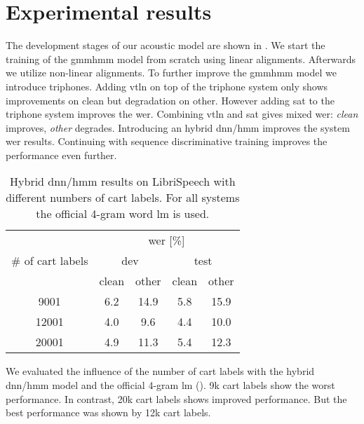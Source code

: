 \documentclass[a4paper]{article}
\begin{document}
\section{Experimental results}
\label{sec:results}

The development stages of our acoustic model are shown in .
We start the training of the \ac{gmmhmm} model from scratch using linear alignments.
Afterwards we utilize non-linear alignments.
To further improve the \ac{gmmhmm} model we introduce triphones.
Adding \ac{vtln} on top of the triphone system only shows improvements on clean but degradation on other.
However adding \ac{sat} to the triphone system improves the \ac{wer}.
Combining \ac{vtln} and \ac{sat} gives mixed \ac{wer}: \emph{clean} improves, \emph{other} degrades.
Introducing an hybrid \ac{dnn}/\ac{hmm} improves the system \ac{wer} results.
Continuing with sequence discriminative training improves the performance even further.

\begin{table}[!ht]
\centering
\caption{Hybrid \ac{dnn}/\ac{hmm} results on LibriSpeech with different numbers of \ac{cart} labels. For all systems the official 4-gram word \ac{lm} is used.}
\label{tab:num}
\begin{tabular}{|c|c|c|c|c|}
\hline
\multirow{3}{*}{\# of \ac{cart} labels} & \multicolumn{4}{c|}{\acs*{wer} {[}\%{]}} \\ \cline{2-5}
                       & \multicolumn{2}{c|}{dev}           & \multicolumn{2}{c|}{test} \\ \cline{2-5}
                       & clean & other & clean & other \\ \hline \hline
9001                   &  6.2  & 14.9  &  5.8  & 15.9  \\ \hline
12001                  &  4.0  &  9.6  &  4.4  & 10.0  \\ \hline
20001                  &  4.9  & 11.3  &  5.4  & 12.3  \\ \hline
\end{tabular}
\end{table}

We evaluated the influence of the number of \ac{cart} labels with the hybrid \ac{dnn}/\ac{hmm} model and the official 4-gram \ac{lm} ().
9k \ac{cart} labels show the worst performance.
In contrast, 20k \ac{cart} labels shows improved performance.
But the best performance was shown by 12k \ac{cart} labels.
\end{document}
